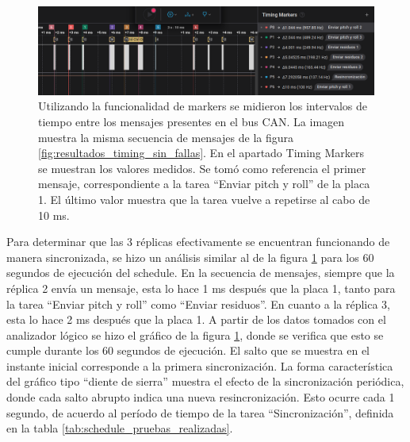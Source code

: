 \begin{figure}[!t]
    \centering
    \includegraphics[width=\textwidth]{img/resultados_timing_detalle_sin_fallas.png}
    \caption{Utilizando la funcionalidad de markers se midieron los intervalos de tiempo entre los mensajes presentes en el bus CAN. La imagen muestra la misma secuencia de mensajes de la figura \ref{fig:resultados_timing_sin_fallas}. En el apartado Timing Markers se muestran los valores medidos. Se tomó como referencia el primer mensaje, correspondiente a la tarea ``Enviar pitch y roll'' de la placa 1. El último valor muestra que la tarea vuelve a repetirse al cabo de 10 ms.}
    \label{fig:resultados_timing_detalle_sin_fallas}
\end{figure}

Para determinar que las 3 réplicas efectivamente se encuentran funcionando de manera sincronizada, se hizo un análisis similar al de la figura \ref{fig:resultados_timing_detalle_sin_fallas} para los 60 segundos de ejecución del schedule. En la secuencia de mensajes, siempre que la réplica 2 envía un mensaje, esta lo hace 1 ms después que la placa 1, tanto para la tarea ``Enviar pitch y roll'' como ``Enviar residuos''. En cuanto a la réplica 3, esta lo hace 2 ms después que la placa 1. A partir de los datos tomados con el analizador lógico se hizo el gráfico de la figura \ref{fig:resultados_timing_detalle_sin_fallas}, donde se verifica que esto se cumple durante los 60 segundos de ejecución. El salto que se muestra en el instante inicial corresponde a la primera sincronización. La forma característica del gráfico tipo ``diente de sierra'' muestra el efecto de la sincronización periódica, donde cada salto abrupto indica una nueva resincronización. Esto ocurre cada 1 segundo, de acuerdo al período de tiempo de la tarea ``Sincronización'', definida en la tabla \ref{tab:schedule_pruebas_realizadas}.

